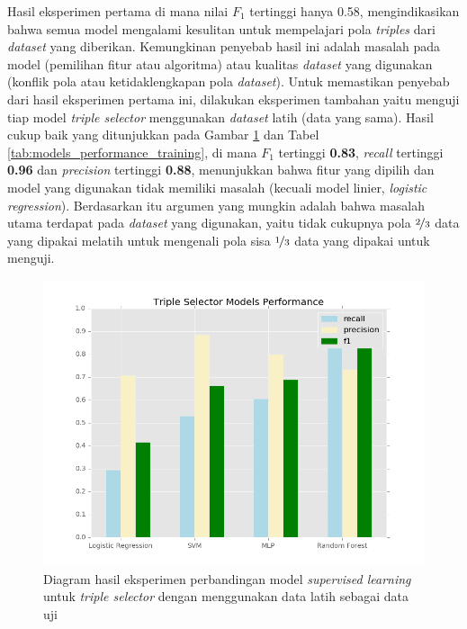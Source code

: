 Hasil eksperimen pertama di mana nilai $F_1$ tertinggi hanya 0.58, mengindikasikan bahwa semua model mengalami kesulitan untuk mempelajari pola \textit{triples} dari \textit{dataset} yang diberikan. Kemungkinan penyebab hasil ini adalah masalah pada model (pemilihan fitur atau algoritma) atau kualitas \textit{dataset} yang digunakan (konflik pola atau ketidaklengkapan pola \textit{dataset}). Untuk memastikan penyebab dari hasil eksperimen pertama ini, dilakukan eksperimen tambahan yaitu menguji tiap model \textit{triple selector} menggunakan \textit{dataset} latih (data yang sama). Hasil cukup baik yang ditunjukkan pada Gambar \ref{fig:models_performance_training} dan Tabel \ref{tab:models_performance_training}, di mana $F_1$ tertinggi \textbf{0.83}, \textit{recall} tertinggi \textbf{0.96} dan \textit{precision} tertinggi \textbf{0.88}, menunjukkan bahwa fitur yang dipilih dan model yang digunakan tidak memiliki masalah (kecuali model linier, \textit{logistic regression}). Berdasarkan itu argumen yang mungkin adalah bahwa masalah utama terdapat pada \textit{dataset} yang digunakan, yaitu tidak cukupnya pola $\nicefrac{2}{3}$ data yang dipakai melatih untuk mengenali pola sisa $\nicefrac{1}{3}$ data yang dipakai untuk menguji.

\begin{figure}
	\includegraphics[width=\textwidth]{../images/models_performance_training.png}
	\caption{Diagram hasil eksperimen perbandingan model \textit{supervised learning} untuk \textit{triple selector} dengan menggunakan data latih sebagai data uji}
	\label{fig:models_performance_training}
\end{figure}

